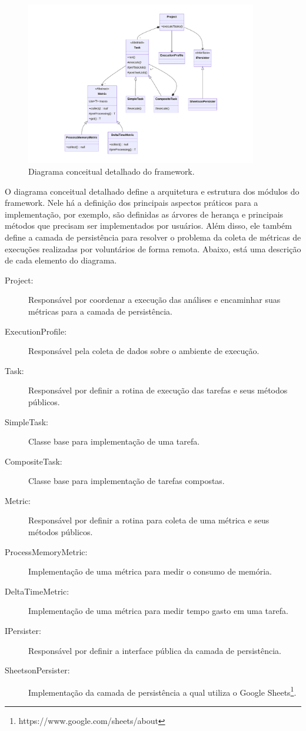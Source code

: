 \documentclass[12pt]{tcc}
\begin{document}
\begin{figure}[!ht]
	\centering
	\includegraphics[width=0.9\textwidth]{figures/diagrama-classes.pdf}
	\caption{Diagrama conceitual detalhado do framework.}
	\label{fig:diag-classes}
\end{figure}

O diagrama conceitual detalhado define a arquitetura e estrutura dos módulos do framework.
Nele há a definição dos principais aspectos práticos para a implementação, por exemplo, são definidas as árvores de herança e principais métodos que precisam ser implementados por usuários.
Além disso, ele também define a camada de persistência para resolver o problema da coleta de métricas de execuções realizadas por voluntários de forma remota.
Abaixo, está uma descrição de cada elemento do diagrama.

\begin{description}
	\item[Project:] Responsável por coordenar a execução das análises e encaminhar suas métricas para a camada de persistência.
	\item[ExecutionProfile:] Responsável pela coleta de dados sobre o ambiente de execução.
	\item[Task:] Responsável por definir a rotina de execução das tarefas e seus métodos públicos.
	\item[SimpleTask:] Classe base para implementação de uma tarefa.
	\item[CompositeTask:] Classe base para implementação de tarefas compostas.
	\item[Metric:] Responsável por definir a rotina para coleta de uma métrica e seus métodos públicos.
	\item[ProcessMemoryMetric:] Implementação de uma métrica para medir o consumo de memória.
	\item[DeltaTimeMetric:] Implementação de uma métrica para medir tempo gasto em uma tarefa.
	\item[IPersister:] Responsável por definir a interface pública da camada de persistência.
	\item[SheetsonPersister:] Implementação da camada de persistência a qual utiliza o Google Sheets\footnote{https://www.google.com/sheets/about}.
\end{description}
\end{document}
